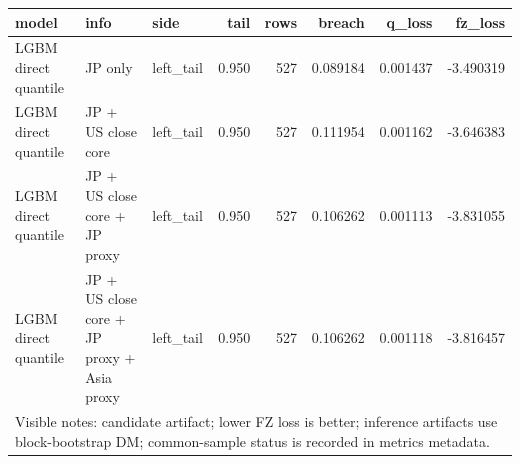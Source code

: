 \begin{tabular}{lllrrrrr}
\toprule
model & info & side & tail & rows & breach & q_loss & fz_loss \\
\midrule
LGBM direct quantile & JP only & left\_tail & 0.950 & 527 & 0.089184 & 0.001437 & -3.490319 \\
LGBM direct quantile & JP + US close core & left\_tail & 0.950 & 527 & 0.111954 & 0.001162 & -3.646383 \\
LGBM direct quantile & JP + US close core + JP proxy & left\_tail & 0.950 & 527 & 0.106262 & 0.001113 & -3.831055 \\
LGBM direct quantile & JP + US close core + JP proxy + Asia proxy & left\_tail & 0.950 & 527 & 0.106262 & 0.001118 & -3.816457 \\
\midrule
\multicolumn{8}{l}{\footnotesize Visible notes: candidate artifact; lower FZ loss is better; inference artifacts use block-bootstrap DM; common-sample status is recorded in metrics metadata.} \\
\bottomrule
\end{tabular}
